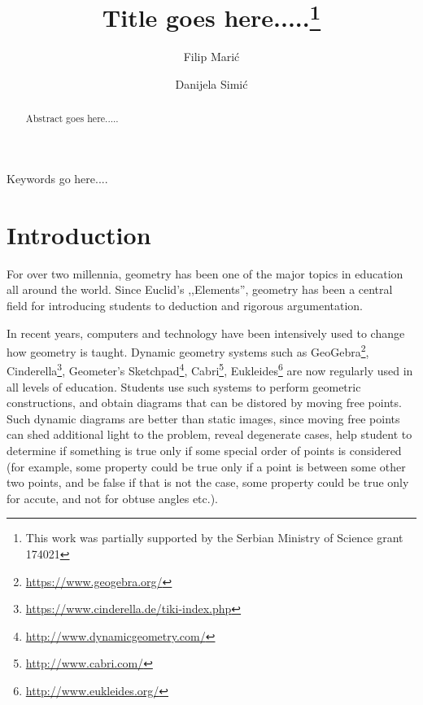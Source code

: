 \documentclass[final,1p,times,authoryear]{elsarticle}
\begin{document}
\begin{frontmatter}

\title{Title goes here.....\footnote{This work was partially supported by the Serbian Ministry of Science grant 174021}}

\author{Filip Mari\' c}
\address{School of Mathematics, University of Belgrade, Studentski trg 16, 11000, Belgrade, Serbia}

\author{Danijela Simi\' c}
\address{School of Mathematics, University of Belgrade, Studentski trg 16, 11000, Belgrade, Serbia}

\begin{abstract}
Abstract goes here.....
\end{abstract}

\begin{keyword}
Keywords go here.... 
\end{keyword}
\end{frontmatter}


\section{Introduction}
For over two millennia, geometry has been one of the major topics in
education all around the world. Since Euclid's ,,Elements'', geometry
has been a central field for introducing students to deduction and
rigorous argumentation. 

In recent years, computers and technology have been intensively used
to change how geometry is taught. Dynamic geometry systems such as
GeoGebra\footnote{\url{https://www.geogebra.org/}},
Cinderella\footnote{\url{https://www.cinderella.de/tiki-index.php}},
Geometer's Sketchpad\footnote{\url{http://www.dynamicgeometry.com/}},
Cabri\footnote{\url{http://www.cabri.com/}},
Eukleides\footnote{\url{http://www.eukleides.org/}} are now regularly used
in all levels of education. Students use such systems to perform
geometric constructions, and obtain diagrams that can be distored by
moving free points. Such dynamic diagrams are better than static
images, since moving free points can shed additional light to the
problem, reveal degenerate cases, help student to determine if
something is true only if some special order of points is considered
(for example, some property could be true only if a point is between
some other two points, and be false if that is not the case, some
property could be true only for accute, and not for obtuse angles
etc.).
\end{document}
